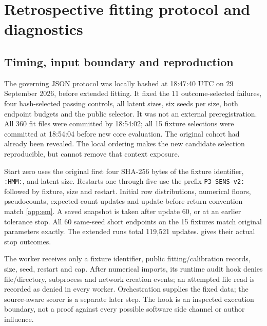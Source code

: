 
\FloatBarrier

\section{Retrospective fitting protocol and diagnostics}\label{app:sensitivity}
\subsection{Timing, input boundary and reproduction}
The governing JSON protocol was locally hashed at 18:47:40 UTC on 29 September 2026, before extended fitting. It fixed the 11 outcome-selected failures, four hash-selected passing controls, all latent sizes, six seeds per size, both endpoint budgets and the public selector. It was not an external preregistration. All 360 fit files were committed by 18:54:02; all 15 fixture selections were committed at 18:54:04 before new core evaluation. The original cohort had already been revealed. The local ordering makes the new candidate selection reproducible, but cannot remove that context exposure.

Start zero uses the original first four SHA-256 bytes of the fixture identifier, \texttt{:HMM:}, and latent size. Restarts one through five use the prefix \texttt{P3-SENS-v2:} followed by fixture, size and restart. Initial row distributions, numerical floors, pseudocounts, expected-count updates and update-before-return convention match \cref{app:em}. A saved snapshot is taken after update 60, or at an earlier tolerance stop. All 60 same-seed short endpoints on the 15 fixtures match original parameters exactly. The extended runs total 119,521 updates.  gives their actual stop outcomes.

The worker receives only a fixture identifier, public fitting/calibration records, size, seed, restart and cap. After numerical imports, its runtime audit hook denies file/directory, subprocess and network creation events; an attempted file read is recorded as denied in every worker. Orchestration supplies the fixed data; the source-aware scorer is a separate later step. The hook is an inspected execution boundary, not a proof against every possible software side channel or author influence.


